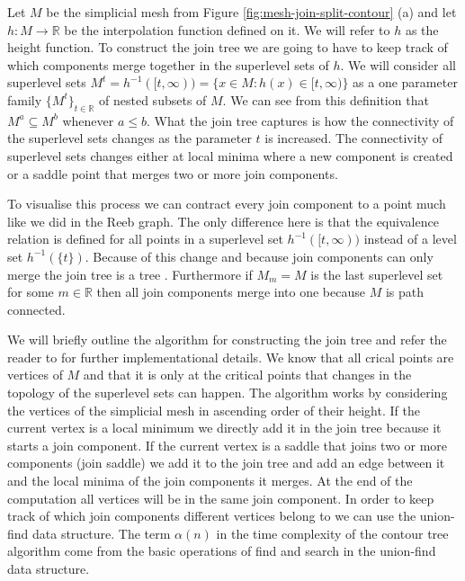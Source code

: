 Let $M$ be the simplicial mesh from Figure \ref{fig:mesh-join-split-contour} (a) and let $h : M \to \mathbb{R}$ be the interpolation function defined on it. We will refer to $h$ as the height function. To construct the join tree we are going to have to keep track of which components merge together in the superlevel sets of $h$. We will consider all superlevel sets $M^t = h^{-1}([t, \infty)) = \{x \in M : h(x) \in [t, \infty) \}$ as a one parameter family $\{M^t\}_{t \in \mathbb{R}}$
of nested subsets of $M$. We can see from this definition that $M^a \subseteq M^b$ whenever $a \le b$. What the join tree captures is how the connectivity of the superlevel sets changes as the parameter $t$ is increased. The connectivity of superlevel sets changes either at local minima where a new component is created or a saddle point that merges two or more join components.


To visualise this process we can contract every join component to a point much like we did in the Reeb graph. The only difference here is that the equivalence relation is defined for all points in a superlevel set $h^{-1}([t, \infty))$ instead of a level set $h^{-1}(\{t\})$. Because of this change and because join components can only merge the join tree is a tree \cite{comp-topo}. Furthermore if $M_m = M$ is the last superlevel set for some $m \in \mathbb{R}$ then all join components merge into one because $M$ is path connected.


We will briefly outline the algorithm for constructing the join tree and refer the reader to \cite{ct-big-paper} for further implementational details. We know that all crical points are vertices of $M$ and that it is only at the critical points that changes in the topology of the superlevel sets can happen. The algorithm works by considering the vertices of the simplicial mesh in ascending order of their height. If the current vertex is a local minimum we directly add it in the join tree because it starts a join component. If the current vertex is a saddle that joins two or more components (join saddle) we add it to the join tree and add an edge between it and the local minima of the join components it merges. At the end of the computation all vertices will be in the same join component. In order to keep track of which join components different vertices belong to we can use the union-find data structure. The term  $\alpha(n)$ in the time complexity of the contour tree algorithm come from the basic operations of find and search in the union-find data structure.

